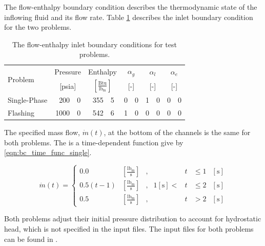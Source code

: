 The flow-enthalpy boundary condition describes the thermodynamic state of the inflowing fluid and its flow rate.
Table \ref{tab:bc_fe} describes the inlet boundary condition for the two problems.

\begin{table}[ht]
\centering
\begin{tabular}{@{}lr@{.}lr@{.}lr@{.}lr@{.}lr@{.}l@{}} \toprule
\multirow{2}{*}{Problem} & \multicolumn{2}{c}{Pressure} & \multicolumn{2}{c}{Enthalpy}             & \multicolumn{2}{c}{$\alpha_g$} & \multicolumn{2}{c}{$\alpha_l$} & \multicolumn{2}{c}{$\alpha_e$} \\ 
                         & \multicolumn{2}{c}{[psia]} & \multicolumn{2}{c}{$[\frac{\text{Btu}}{\text{lb}_{\text{m}}}]$} & \multicolumn{2}{c}{[-]}      & \multicolumn{2}{c}{[-]}      & \multicolumn{2}{c}{[-]}      \\ \midrule
Single-Phase             &  200&0                       &  355&5                                   & 0&0                            & 1&0                            & 0&0 \\
Flashing                 & 1000&0                       &  542&6                                   & 1&0                            & 0&0                            & 0&0 \\ \bottomrule  
\end{tabular}
\caption{The flow-enthalpy inlet boundary conditions for test problems.}
\label{tab:bc_fe}
\end{table}

The specified mass flow, $\dot{m}(t)$, at the bottom of the channels is the same for both problems. 
The is a time-dependent function give by \eqref{eqn:bc_time_func_single}.

\begin{equation}
\label{eqn:bc_time_func_single}
\dot{m}(t) = \left\{
\begin{array}{cclrcll}
 0.0           & [\frac{\text{lb}_{\text{m}}}{\text{s}}] & , &         & t & \leq 1 &[\text{s}] \\
 0.5 ( t - 1)  & [\frac{\text{lb}_{\text{m}}}{\text{s}}] & , & 1 [\text{s}] < & t & \leq 2 &[\text{s}] \\
 0.5           & [\frac{\text{lb}_{\text{m}}}{\text{s}}] & , &         & t & > 2    &[\text{s}]
\end{array}\right.
\end{equation}

Both problems adjust their initial pressure distribution to account for hydrostatic head, which is not specified in the input files.
The \cobra{} input files for both problems can be found in .

